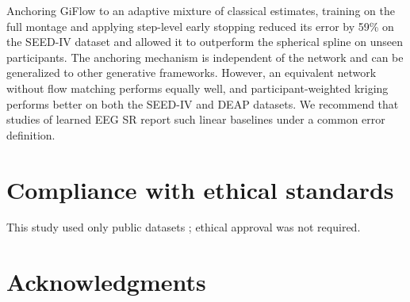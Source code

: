 \documentclass{article}
\begin{document}
Anchoring GiFlow to an adaptive mixture of classical estimates, training on
the full montage and applying step-level early stopping reduced its error
by 59\% on the SEED-IV dataset and allowed it to outperform the spherical
spline on unseen participants. The anchoring mechanism is independent of
the network and can be generalized to other generative frameworks.
However, an equivalent network without flow matching performs equally
well, and participant-weighted kriging performs better on both the SEED-IV
and DEAP datasets. We recommend that studies of learned EEG SR report such
linear baselines under a common error definition.

\section{Compliance with ethical standards}
\label{sec:ethics}

This study used only public datasets \cite{zheng2019emotionmeter,koelstra2012deap};
ethical approval was not required.

\section{Acknowledgments}
\label{sec:acknowledgments}




\end{document}
